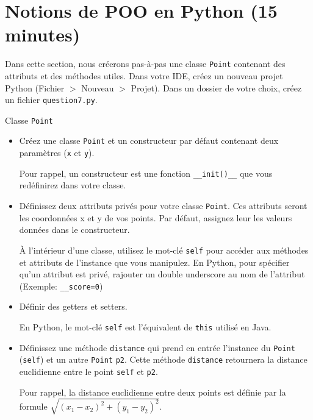 \section{Notions de POO en Python (15 minutes)}
\label{sec:notions_python}
Dans cette section, nous créerons pas-à-pas une classe \lstinline{Point} contenant des attributs et des méthodes utiles.
Dans votre IDE, créez un nouveau projet Python (Fichier $>$ Nouveau $>$ Projet). Dans un dossier de votre choix, créez un fichier \lstinline{question7.py}.\\
\begin{Exercice}[15 minutes] Classe \lstinline{Point}
    \begin{itemize}
        \item Créez une classe \lstinline{Point} et un constructeur par défaut contenant deux paramètres (\lstinline{x} et \lstinline{y}).
        \begin{conseil}
            Pour rappel, un constructeur est une fonction \lstinline{__init()__} que vous redéfinirez dans votre classe.
        \end{conseil}
        \item Définissez deux attributs privés pour votre classe \lstinline{Point}. Ces attributs seront les coordonnées x et y de vos points. Par défaut, assignez leur les valeurs données dans le constructeur.
        \begin{conseil}
            À l'intérieur d'une classe, utilisez le mot-clé \lstinline{self} pour accéder aux méthodes et attributs de l'instance que vous manipulez.
            En Python, pour spécifier qu'un attribut est privé, rajouter un double underscore au nom de l'attribut (Exemple: \lstinline{__score=0})
        \end{conseil}
        \item Définir des getters et setters.
        \begin{conseil}
            En Python, le mot-clé \lstinline{self} est l'équivalent de \lstinline{this} utilisé en Java.
        \end{conseil}
        \item Définissez une méthode \lstinline{distance} qui prend en entrée l'instance du \lstinline{Point} (\lstinline{self}) et un autre \lstinline{Point} \lstinline{p2}. Cette méthode \lstinline{distance} retournera la distance euclidienne entre le point \lstinline{self} et \lstinline{p2}. 
        \begin{conseil}
            Pour rappel, la distance euclidienne entre deux points est définie par la formule $\sqrt{(x_1 - x_2)^2 + (y_1 - y_2)^2}$.

\end{conseil}
\end{itemize}
\end{Exercice}
